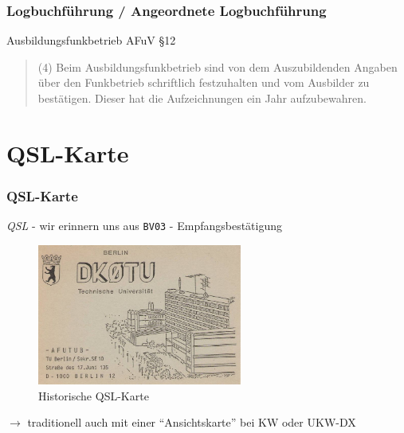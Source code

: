 \begin{frame}
  \frametitle{Logbuchführung / Angeordnete Logbuchführung}

  \begin{exampleblock}{Ausbildungsfunkbetrieb}
    AFuV §12
    \begin{quote}
      (4) Beim Ausbildungsfunkbetrieb sind von dem Auszubildenden Angaben über den Funkbetrieb schriftlich festzuhalten und vom Ausbilder zu bestätigen. Dieser hat die Aufzeichnungen ein Jahr aufzubewahren.
    \end{quote}
  \end{exampleblock}
\end{frame}


\section{QSL-Karte}

\begin{frame}
  \frametitle{QSL-Karte}

  \emph{QSL} - wir erinnern uns aus \texttt{BV03} - Empfangsbestätigung \\[1em]

  \begin{center}
    \begin{figure}
      \includegraphics[width=0.6\textwidth,height=.6\textheight,keepaspectratio]{bv13/DK0TU_1.jpg}
      \caption{Historische QSL-Karte}
    \end{figure}
  \end{center}

  $\rightarrow$ traditionell auch mit einer ``Ansichtskarte'' bei KW oder UKW-DX

\end{frame}


